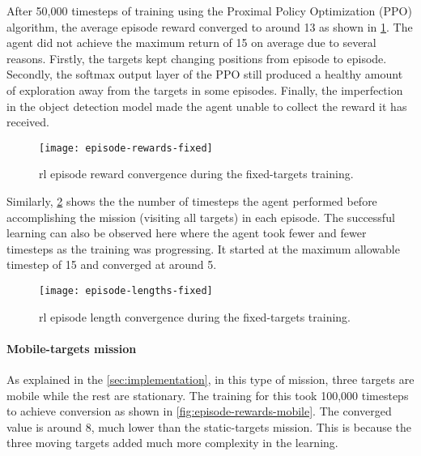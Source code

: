 \documentclass[../main.tex]{subfiles}
\begin{document}
After 50,000 timesteps of training using the Proximal Policy
Optimization (PPO) algorithm, the average episode reward converged
to around 13 as shown in \cref{fig:episode-rewards-fixed}.
The agent did not achieve the maximum return of 15
on average
due to several reasons. Firstly, the
targets kept changing positions from episode to episode.
Secondly, the softmax output layer of the PPO still produced 
a healthy amount
of exploration away from the targets in some episodes.
Finally, the imperfection in the object detection model made
the agent unable to collect the reward it has received. 

\begin{figure}[tbp]
	\centering
	\texttt{[image: episode-rewards-fixed]}
        \caption{\gls{rl} episode reward convergence during the
        fixed-targets training.}
        \label{fig:episode-rewards-fixed}
\end{figure}

Similarly, \cref{fig:episode-lengths-fixed} shows the the number of
timesteps the agent performed before accomplishing the mission
(visiting all targets) in each episode.
The successful learning can also be observed here where the agent took
fewer and fewer timesteps as the training was progressing.
It started at the maximum allowable timestep of 15 and converged at
around 5.

\begin{figure}[tbp]
	\centering
	\texttt{[image: episode-lengths-fixed]}
        \caption{\gls{rl} episode length convergence during the
        fixed-targets training.}
        \label{fig:episode-lengths-fixed}
\end{figure}

\paragraph{Mobile-targets mission}

As explained in the \cref{sec:implementation}, in this type of
mission, three targets are mobile while the rest are stationary.
The training for this took 100,000 timesteps to achieve conversion as
shown in \cref{fig:episode-rewards-mobile}.
The converged value is around 8, much lower than the static-targets
mission.
This is because the three moving targets added much more complexity in the
learning.
\end{document}
